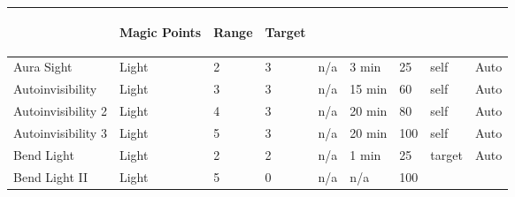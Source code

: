 \documentclass[twoside]{book}
\begin{document}
\begin{longtable}{p{1.25in}lp{2em}p{3em}llp{7em}ll}
  &
  \begin{turn}{70}{Magic Points}\end{turn}
          
  &
  \begin{turn}{70}{Range}\end{turn}
          
  &
  \begin{turn}{70}{Target}\end{turn}
          
  \\
  \hline
  \endhead
      
  \raggedright
           Aura Sight 
  &
   Light 
  &
   2 
  &
   3
           
  &
   n/a 
  &
   3 min
           
  &
   25
           
  &
   self 
  &
   Auto 
  \tabularnewline
      
  \raggedright
           Autoinvisibility 
  &
   Light 
  &
   3 
  &
   3
           
  &
   n/a 
  &
   15 min
           
  &
   60
           
  &
   self 
  &
   Auto 
  \tabularnewline
      
  \raggedright
           Autoinvisibility 2 
  &
   Light 
  &
   4 
  &
   3
           
  &
   n/a 
  &
   20 min
           
  &
   80
           
  &
   self 
  &
   Auto 
  \tabularnewline
      
  \raggedright
           Autoinvisibility 3 
  &
   Light 
  &
   5 
  &
   3
           
  &
   n/a 
  &
   20 min
           
  &
   100
           
  &
   self 
  &
   Auto 
  \tabularnewline
      
  \raggedright
           Bend Light 
  &
   Light 
  &
   2 
  &
   2
           
  &
   n/a 
  &
   1 min
           
  &
   25
           
  &
   target 
  &
   Auto 
  \tabularnewline
      
  \raggedright
           Bend Light II 
  &
   Light 
  &
   5 
  &
   0
           
  &
   n/a 
  &
   n/a 
  &
   100
           

\end{longtable}
\end{document}
